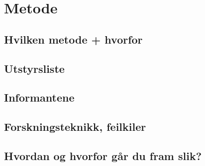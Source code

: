 \section{Metode}

\subsection{Hvilken metode + hvorfor}

\subsection{Utstyrsliste}

\subsection{Informantene}

\subsection{Forskningsteknikk, feilkiler}

\subsection{Hvordan og hvorfor går du fram slik?}


\newpage